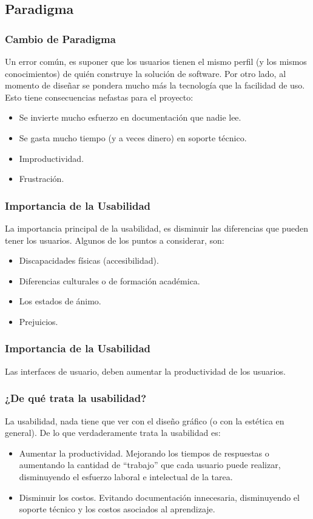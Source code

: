 \documentclass[12pt]{beamer}
\begin{document}
\subsection{Paradigma}

\begin{frame}
 \frametitle{Cambio de Paradigma}
 Un error común, es suponer que los usuarios tienen el mismo perfil (y los mismos conocimientos) de quién construye la solución de software. Por otro lado, al momento de diseñar se pondera mucho más la tecnología que la facilidad de uso.
 \newline
 Esto tiene consecuencias nefastas para el proyecto:
 \begin{itemize}
  \item<2-> Se invierte mucho esfuerzo en documentación que nadie lee.
  \item<3-> Se gasta mucho tiempo (y a veces dinero) en soporte técnico.
  \item<4-> Improductividad.
  \item<5-> Frustración.
 \end{itemize}
\end{frame}



\begin{frame}
 \frametitle{Importancia de la Usabilidad}
 La importancia principal de la usabilidad, es disminuir las diferencias que pueden tener los usuarios. Algunos de los puntos a considerar, son:
 \begin{itemize}
  \item<2-> Discapacidades físicas (accesibilidad).
  \item<3-> Diferencias culturales o de formación académica.
  \item<4-> Los estados de ánimo.
  \item<5-> Prejuicios.
 \end{itemize}
\end{frame}


\begin{frame}
 \frametitle{Importancia de la Usabilidad}
 Las interfaces de usuario, \alert{deben} aumentar la productividad de los usuarios.
\end{frame}


\begin{frame}
 \frametitle{¿De qué trata la usabilidad?}
 La usabilidad, \alert{nada} tiene que ver con el diseño gráfico (o con la estética en general).
 \newline
 De lo que verdaderamente trata la usabilidad es:
 \begin{itemize}
  \item<2-> Aumentar la productividad. Mejorando los tiempos de respuestas o aumentando la cantidad de ``trabajo'' que cada usuario puede realizar, disminuyendo el esfuerzo laboral e intelectual de la tarea.
  \item<3-> Disminuir los costos. Evitando documentación innecesaria, disminuyendo el soporte técnico y los costos asociados al aprendizaje.
 \end{itemize}

\end{frame}
\end{document}

